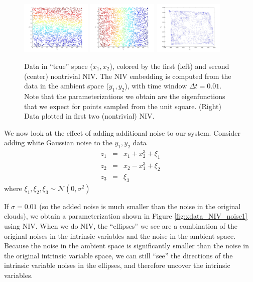 \documentclass[12pt]{article}
\begin{document}
\begin{figure}[htb]
\includegraphics[width=0.3\textwidth]{xdata_colored_NIV1}
\includegraphics[width=0.3\textwidth]{xdata_colored_NIV2}
\includegraphics[width=0.3\textwidth]{embedding_NIV}
\caption{Data in ``true'' space ($x_1, x_2$), colored by the first (left) and second (center) nontrivial NIV. The NIV embedding is computed from the data in the ambient space ($y_1, y_2$), with time window $\Delta t = 0.01$. Note that the parameterizations we obtain are the eigenfunctions that we expect for points sampled from the unit square. (Right) Data plotted in first two (nontrivial) NIV.}
\label{fig:xdata_NIV}
\end{figure}

We now look at the effect of adding additional noise to our system.
%
Consider adding white Gaussian noise to the $y_1, y_2$ data
\begin{eqnarray}
z_1 & = & x_1 + x_2^3 + \xi_1 \\
z_2 & = & x_2 - x_1^3 + \xi_2 \\
z_3 & = & \xi_3
\end{eqnarray}
where $\xi_1, \xi_2, \xi_3 \sim \mathcal{N}(0, \sigma^2)$

If $\sigma = 0.01$ (so the added noise is much smaller than the noise in the original clouds), we obtain a parameterization shown in Figure \ref{fig:xdata_NIV_noise1} using NIV.
%
When we do NIV, the ``ellipses'' we see are a combination of the original noises in the intrinsic variables and the noise in the ambient space.
%
Because the noise in the ambient space is significantly smaller than the noise in the original intrinsic variable space, we can still ``see'' the directions of the intrinsic variable noises in the ellipses, and therefore uncover the intrinsic variables.
\end{document}
